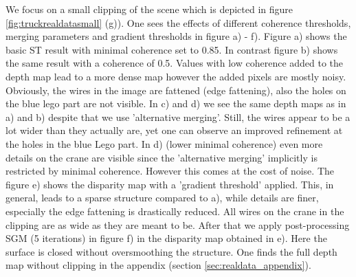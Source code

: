 \documentclass  [
  paper    = a4,
  BCOR     = 10mm,
  twoside,
  fontsize = 12pt,
  fleqn,
  toc      = bibnumbered,
  toc      = listofnumbered,
  numbers  = noendperiod,
  headings = normal,
  listof   = leveldown,
  version  = 3.03
]                                       {scrreprt}
\begin{document}
We focus on a small clipping of the scene which is depicted in figure \ref{fig:truckrealdatasmall} (g)). One sees the effects of different coherence thresholds, merging parameters and gradient thresholds in figure a) - f). Figure a) shows the basic ST result with minimal coherence set to 0.85. In contrast figure b) shows the same result with a coherence of 0.5. Values with low coherence added to the depth map lead to a more dense map however the added pixels are mostly noisy. Obviously, the wires in the image are fattened (edge fattening), also the holes on the blue lego part are not visible. In c) and d) we see the same depth maps as in a) and b) despite that we use 'alternative merging'. Still, the wires appear to be a lot wider than they actually are, yet one can observe an improved refinement at the holes in the blue Lego part. In d) (lower minimal coherence) even more details on the crane are visible since the 'alternative merging' implicitly is restricted by minimal coherence. However this comes at the cost of noise. The figure e) shows the disparity map with a 'gradient threshold' applied. This, in general, leads to a sparse structure compared to a), while details are finer, especially the edge fattening is drastically reduced. All wires on the crane in the clipping are as wide as they are meant to be. After that we apply post-processing SGM (5 iterations) in figure f) in the disparity map obtained in e). Here the surface is closed without oversmoothing the structure. One finds the full depth map without clipping in the appendix (section \ref{sec:realdata_appendix}).
\end{document}
